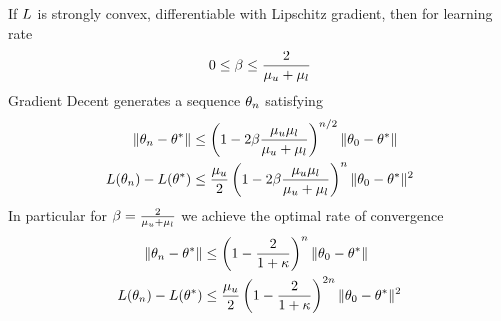 \begin{theorem}
	If \(L\) is strongly convex, differentiable with Lipschitz gradient, then
	for learning rate
	\[0 \le \beta \le \frac{2}{\mu_u+\mu_l}\]
	Gradient Decent generates a sequence \(\theta_n\) satisfying
	\begin{subequations}
	\begin{align}
		\label{eq: gd strong convexity convergence rate 1}
		\|\theta_n - \theta^*\|
		&\le \left(
			1- 2\beta\frac{\mu_u\mu_l}{\mu_u+\mu_l}
		\right)^{n/2}
		\|\theta_0 - \theta^*\| \\
		\label{eq: gd strong convexity convergence rate 2}
		L(\theta_n) - L(\theta^*)
		&\le \frac{\mu_u}{2} \left(
			1- 2\beta\frac{\mu_u\mu_l}{\mu_u+\mu_l}
		\right)^{n}
		\|\theta_0 - \theta^*\|^2
	\end{align}
	\end{subequations}
	In particular for \(\beta=\tfrac2{\mu_u+\mu_l}\) we achieve the optimal
	rate of convergence
	\begin{subequations}\label{eq: gd strong convexity optimal rate}
	\begin{align}
		\|\theta_n - \theta^*\|
		&\le \left(
			1- \frac{2}{1+\kappa}
		\right)^n
		\|\theta_0 - \theta^*\| \\
		L(\theta_n) - L(\theta^*)
		&\le \frac{\mu_u}{2} \left(
			1- \frac{2}{1+\kappa}
		\right)^{2n}
		\|\theta_0 - \theta^*\|^2
	\end{align}
	\end{subequations}
\end{theorem}

